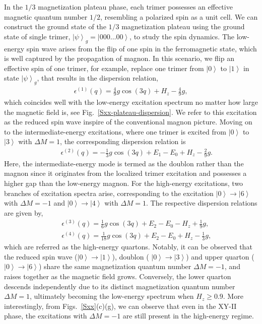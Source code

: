 \documentclass[aps,prx,showpacs,floatfix,twocolumn,superscriptaddress,nofootinbib,longbibliography]{revtex4-2}
\begin{document}
In the $1/3$ magnetization plateau phase, each trimer possesses  an effective magnetic quantum number $1/2$, resembling a polarized spin as a unit cell. We can construct the ground state of the $1/3$ magnetization plateau using the ground state of single trimer, $\left|\psi\right\rangle_g = \left|000\dots00\right\rangle$,  to study the spin dynamics.
The low-energy spin wave arises from the flip of one spin in the ferromagnetic state, which is well captured by the propagation of magnon. In this scenario, we flip an effective spin of one trimer, for example, replace one trimer from $\left|0\right\rangle$ to $\left|1\right\rangle$ in state $\left|\psi\right\rangle_g $, that results in the dispersion relation, 
\begin{eqnarray}
	\epsilon^{(1)}(q)=	\frac{4}{9} g \cos{(3q)}+ H_z - \frac{4}{9}g,
\end{eqnarray}
which coincides well with the low-energy excitation spectrum no matter how large the magnetic field is, see Fig.~\ref{Sxx-plateau-dispersion}. We refer to this excitation as the reduced spin wave  inspire of the conventional magnon picture. Moving on to the intermediate-energy excitations, where one trimer is excited from $\left|0\right\rangle$ to $\left|3\right\rangle$ with $\Delta M=1$, the corresponding  dispersion relation is 
\begin{eqnarray}
	&&\epsilon^{(2)}(q)=-\frac{1}{3} g \cos{(3q)}+ E_1-E_0+H_z-\frac{2}{9}g.
\end{eqnarray}
Here, the intermediate-energy mode is termed as the doublon rather than the magnon since it originates from the localized trimer excitation and possesses a higher gap than the low-energy magnon. 
For the high-energy excitations, two branches of excitation spectra arise, corresponding to the  excitation $\left|0\right\rangle \rightarrow \left|6\right\rangle$ with $\Delta M=-1$ and $\left|0\right\rangle \rightarrow \left|4\right\rangle$ with $\Delta M=1$. The respective  dispersion relations are given by,
\begin{eqnarray}
	&&\epsilon^{(3)}(q)=\frac{1}{6} g \cos{(3q)}+ E_2-E_0-H_z+\frac{1}{9}g,\\
	&&\epsilon^{(4)}(q)=\frac{1}{18} g \cos{(3q)} + E_2 -E_0+H_z-\frac{1}{3}g,
\end{eqnarray}
which are referred as  the high-energy  quartons.   Notably, 
it can be observed that  the reduced spin wave ($\left| 0 \right\rangle \rightarrow \left| 1 \right\rangle$), doublon ( $\left| 0 \right\rangle \rightarrow \left| 3 \right\rangle$) and upper quarton ( $\left| 0 \right\rangle \rightarrow \left| 6 \right\rangle$) share the same magnetization quantum number $\Delta M=-1$, and raises together as the magnetic field grows. Conversely,  the lower quarton  descends independently  due to its distinct magnetization quantum number $\Delta M=1$, ultimately becoming the low-energy spectrum when $H_z \geq 0.9$. More interestingly, from Figs.~\ref{Sxx}(c)(g), we can observe that even in the XY-II phase, the excitations with $\Delta M=-1$ are still present in the high-energy regime.
\end{document}
